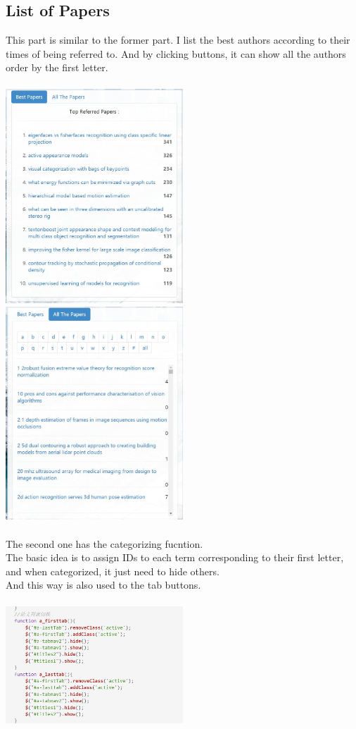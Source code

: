 \documentclass{article}
\begin{document}
	\subsection{List of Papers}
	This part is similar to the former part. I list the best authors according to their times of being referred to. And by clicking buttons, it can show all the authors order by the first letter.\\\\
	\includegraphics[width=0.5\textwidth]{author3.jpg}
	\includegraphics[width=0.5\textwidth]{author4.jpg}\\\\
	The second one has the categorizing fucntion. \\
	The basic idea is to assign IDs to each term corresponding to their first letter, and when categorized, it just need to hide others.\\
	And this way is also used to the tab buttons.\\\\
	\includegraphics[width=0.5\textwidth]{tab1.png}
\end{document}
